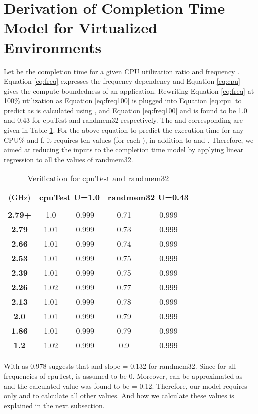 \documentclass{sig-alternate}
\begin{document}
\section{Derivation of Completion Time Model for Virtualized Environments}
\label{sec:PfModelDer}
Let  be the completion time for a given CPU utilization ratio  and frequency . Equation \ref{eq:freq} expresses the frequency dependency and Equation \ref{eq:cpu} gives the compute-boundedness of an application. Rewriting Equation \ref{eq:freq} at 100\% utilization as 
Equation \ref{eq:freq100} is plugged into Equation \ref{eq:cpu} to predict  as 
 is calculated using ,  and Equation \ref{eq:freq100} and is found to be 1.0 and 0.43 for cpuTest and randmem32 respectively. The  and corresponding  are given in Table \ref{ctcpu}. For the above equation to predict the execution time for any CPU\% and f, it requires ten  values (for each ), in addition to  and . Therefore, we aimed at reducing the inputs to the completion time model by applying linear regression to all the  values of randmem32. 
\begin{table}[!htbp]	
\vspace{-0.5cm}
\caption{Verification for cpuTest and randmem32}
\begin{center}
\begin{tabular}{|c|c|c||c|c|}
\hline
 (GHz) & \multicolumn{2}{c||}{\textbf{cpuTest U=1.0}} & \multicolumn{2}{c|}{\textbf{randmem32 U=0.43}} \\ \cline{2-5}
&  &  &  &  \\ \hline 
\textbf{2.79+}	&	1.0	&	0.999	&	0.71	&	0.999	\\	\hline
\textbf{2.79}	&	1.01	&	0.999	&	0.73	&	0.999	\\	\hline
\textbf{2.66}	&	1.01	&	0.999	&	0.74	&	0.999	\\	\hline
\textbf{2.53}	&	1.01	&	0.999	&	0.75	&	0.999	\\	\hline
\textbf{2.39}	&	1.01	&	0.999	&	0.75	&	0.999	\\	\hline
\textbf{2.26}	&	1.02	&	0.999	&	0.77	&	0.999	\\	\hline
\textbf{2.13}	&	1.01	&	0.999	&	0.78	&	0.999	\\	\hline
\textbf{2.0}	&	1.01	&	0.999	&	0.79	&	0.999	\\	\hline
\textbf{1.86}	&	1.01	&	0.999	&	0.79	&	0.999	\\	\hline
\textbf{1.2}	&	1.02	&	0.999	&	0.9	&	0.999	\\	\hline
\end{tabular}
\label{ctcpu}
\end{center}
\vspace{-0.5cm}
\end{table}
With  as 0.978 suggests that  and slope  = 0.132 for randmem32. Since  for all frequencies of cpuTest,  is assumed to be 0. Moreover,  can be approximated as  and the calculated value was found to be  = 0.12. Therefore, our model requires only  and  to calculate all other  values. And how we calculate these values is explained in the next subsection. 
\end{document}
